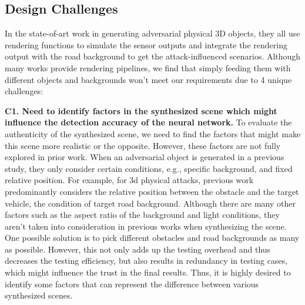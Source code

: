 \subsection{Design Challenges}
In the state-of-art work in generating adversarial physical 3D objects,
they all use rendering functions to simulate the sensor outputs and integrate the rendering output with the road background to get the attack-influenced scenarios.
Although many works provide rendering pipelines, we find that simply feeding them with different objects and backgrounds won't meet our requirements due to 4 unique challenges:

\textbf{C1. Need to identify factors in the synthesized scene which might influence the detection accuracy of the neural network.}
To evaluate the authenticity of the synthesized scene, we need to find the factors that might make this scene more realistic or the opposite.
However, these factors are not fully explored in prior work.
When an adversarial object is generated in a previous study, they only consider certain conditions, e.g., specific background, and fixed relative position.
For example, for 3d physical attacks, previous work predominantly considers the relative position between the obstacle and the target vehicle\cite{25}, 
the condition of target road background\cite{msf-adv, lidar1}. 
Although there are many other factors such as the aspect ratio of the background and light conditions, 
they aren't taken into consideration in previous works when synthesizing the scene.
One possible solution is to pick different obstacles and road backgrounds as many as possible.
However, this not only adds up the testing overhead and thus decreases the testing efficiency, 
but also results in redundancy in testing cases, which might influence the trust in the final results.
Thus, it is highly desired to identify some factors that can represent the difference between various synthesized scenes.

